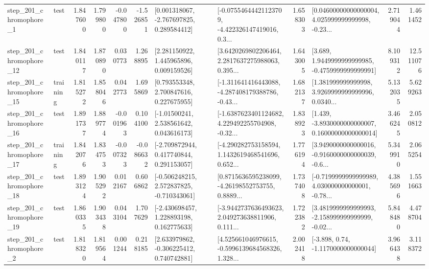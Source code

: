 \begin{tabular}{llrrrrllrlrr}
   step\_201\_chromophore\_1 &      test &      1.847600 &    1.799800 &     -0.047800 & -1.526851 &    [0.001318067, -2.767697825, 0.289584412] &  [-0.07554644421123709, -4.422326147419016, 0.3... &       1.658303 &  [0.04600000000000004, 4.025999999999998, -0.23... &            2.719044 &          1.461452 \\
  step\_201\_chromophore\_12 &      test &      1.840117 &    1.870890 &      0.030773 &  1.268895 &     [2.281150922, 1.445965896, 0.009159526] &  [3.6420269802206464, 2.2817637275988063, 0.395... &       1.643005 &   [3.689, 1.9449999999999985, -0.4759999999999991] &            8.109312 &         12.511076 \\
  step\_201\_chromophore\_15 &  training &      1.815272 &    1.858046 &      0.042773 &  1.695869 &     [0.793553348, 2.700847616, 0.227675955] &  [-1.311641416443088, -4.287408179388786, -0.43... &       1.682137 &  [1.381999999999998, 3.9269999999999996, 0.0340... &            5.132035 &          5.629263 \\
  step\_201\_chromophore\_16 &      test &      1.891737 &    1.889774 &     -0.001963 &  0.104100 &     [-1.01500241, 2.538561642, 0.043616173] &  [-1.6387623401124682, 4.229492255704908, -0.32... &       1.838923 &  [1.439, -3.8930000000000007, 0.16000000000000014] &            3.466245 &          2.050812 \\
  step\_201\_chromophore\_17 &  training &      1.842076 &    1.834753 &     -0.007323 & -0.086632 &    [-2.709872944, 0.417740844, 0.291153057] &  [-4.290282753158594, 1.1432619468541696, 0.652... &       1.776194 &  [3.9490000000000016, -0.9160000000000039, -0.6... &            5.349910 &          2.065254 \\
  step\_201\_chromophore\_18 &      test &      1.893124 &    1.905292 &      0.012167 &  0.606862 &   [-0.506248215, 2.572837825, -0.710343061] &  [0.8715636595238099, -4.26198552753755, 0.8889... &       1.737408 &  [-0.7199999999999989, 4.030000000000001, -0.78... &            4.385696 &          1.551663 \\
  step\_201\_chromophore\_19 &      test &      1.860335 &    1.903438 &      0.043104 &  1.707629 &    [-2.430698457, 1.228893198, 0.162775633] &  [-3.9442737636493623, 2.049273638811906, 0.111... &       1.722382 &  [3.4819999999999993, -2.158999999999999, -0.02... &            5.848480 &          4.478704 \\
   step\_201\_chromophore\_2 &      test &      1.818320 &    1.819564 &      0.001244 &  0.218185 &    [2.633979862, -0.306225412, 0.740742881] &  [4.525661046976615, -0.5996139684568326, 1.328... &       2.002418 &                [-3.898, 0.74, -1.1170000000000044] &            3.966438 &          3.118372 \\

\end{tabular}
